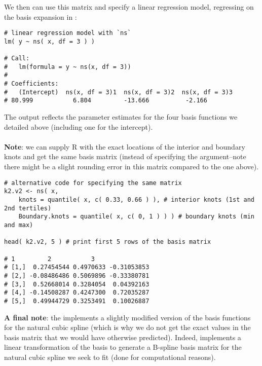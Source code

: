 \documentclass{article}
\begin{document}
\noindent We then can use this matrix and specify a linear regression model, regressing  {} on the basis expansion in  {}:

 \vspace{0.5cm}
 
\begin{lstlisting}
# linear regression model with `ns`
lm( y ~ ns( x, df = 3 ) )

# Call:
#   lm(formula = y ~ ns(x, df = 3))
# 
# Coefficients:
#   (Intercept)  ns(x, df = 3)1  ns(x, df = 3)2  ns(x, df = 3)3  
# 80.999           6.804         -13.666          -2.166  

\end{lstlisting}

 \vspace{0.5cm}
\noindent The output reflects the parameter estimates for the four basis functions we detailed above (including one for the intercept).\\
\\
\noindent \textbf{Note}: we can supply R with the exact locations of the interior and boundary knots and get the same basis matrix (instead of specifying the  {} argument--note there might be a slight rounding error in this matrix compared to the one above).

\vspace{0.5cm}
 
\begin{lstlisting}
# alternative code for specifying the same matrix
k2.v2 <- ns( x, 
    knots = quantile( x, c( 0.33, 0.66 ) ), # interior knots (1st and 2nd tertiles)
    Boundary.knots = quantile( x, c( 0, 1 ) ) ) # boundary knots (min and max)

head( k2.v2, 5 ) # print first 5 rows of the basis matrix

# 1         2           3
# [1,]  0.27454544 0.4970633 -0.31053853
# [2,] -0.08486486 0.5069896 -0.33380781
# [3,]  0.52668014 0.3284054  0.04392163
# [4,] -0.14508287 0.4247300  0.72035287
# [5,]  0.49944729 0.3253491  0.10026887
\end{lstlisting}

\noindent \textbf{A final note}: the {} implements a slightly modified version of the basis functions for the natural cubic spline (which is why we do not get the exact values in the basis matrix that we would have otherwise predicted). Indeed, {} implements a linear transformation of the basis to generate a B-spline basis matrix for the natural cubic spline we seek to fit (done for computational reasons).

\printbibliography[title={References}]
\end{document}
